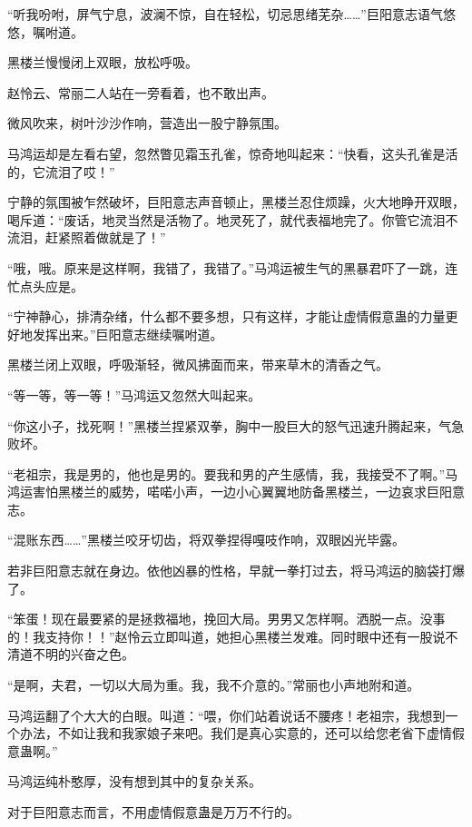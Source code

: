 
\begin{this_body}

“听我吩咐，屏气宁息，波澜不惊，自在轻松，切忌思绪芜杂……”巨阳意志语气悠悠，嘱咐道。

黑楼兰慢慢闭上双眼，放松呼吸。

赵怜云、常丽二人站在一旁看着，也不敢出声。

微风吹来，树叶沙沙作响，营造出一股宁静氛围。

马鸿运却是左看右望，忽然瞥见霜玉孔雀，惊奇地叫起来：“快看，这头孔雀是活的，它流泪了哎！”

宁静的氛围被乍然破坏，巨阳意志声音顿止，黑楼兰忍住烦躁，火大地睁开双眼，喝斥道：“废话，地灵当然是活物了。地灵死了，就代表福地完了。你管它流泪不流泪，赶紧照着做就是了！”

“哦，哦。原来是这样啊，我错了，我错了。”马鸿运被生气的黑暴君吓了一跳，连忙点头应是。

“宁神静心，排清杂绪，什么都不要多想，只有这样，才能让虚情假意蛊的力量更好地发挥出来。”巨阳意志继续嘱咐道。

黑楼兰闭上双眼，呼吸渐轻，微风拂面而来，带来草木的清香之气。

“等一等，等一等！”马鸿运又忽然大叫起来。

“你这小子，找死啊！”黑楼兰捏紧双拳，胸中一股巨大的怒气迅速升腾起来，气急败坏。

“老祖宗，我是男的，他也是男的。要我和男的产生感情，我，我接受不了啊。”马鸿运害怕黑楼兰的威势，喏喏小声，一边小心翼翼地防备黑楼兰，一边哀求巨阳意志。

“混账东西……”黑楼兰咬牙切齿，将双拳捏得嘎吱作响，双眼凶光毕露。

若非巨阳意志就在身边。依他凶暴的性格，早就一拳打过去，将马鸿运的脑袋打爆了。

“笨蛋！现在最要紧的是拯救福地，挽回大局。男男又怎样啊。洒脱一点。没事的！我支持你！！”赵怜云立即叫道，她担心黑楼兰发难。同时眼中还有一股说不清道不明的兴奋之色。

“是啊，夫君，一切以大局为重。我，我不介意的。”常丽也小声地附和道。

马鸿运翻了个大大的白眼。叫道：“喂，你们站着说话不腰疼！老祖宗，我想到一个办法，不如让我和我家娘子来吧。我们是真心实意的，还可以给您老省下虚情假意蛊啊。”

马鸿运纯朴憨厚，没有想到其中的复杂关系。

对于巨阳意志而言，不用虚情假意蛊是万万不行的。


\end{this_body}

